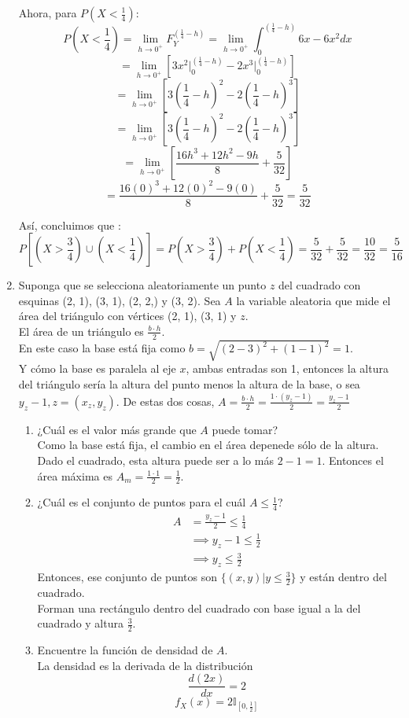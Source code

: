 \documentclass[12pt,a4paper]{report}
\begin{document}
\begin{enumerate}
{			Ahora, para $P(X < \frac{1}{4})$:
				$$ P(X < \frac{1}{4}) = \lim_{h\to 0^+} F_Y^{(\frac{1}{4} - h)}
				   =  \lim_{h\to 0^+} \int_{0}^{(\frac{1}{4} - h)} 6x - 6x^2 dx $$
				$$ =  \lim_{h\to 0^+} [3 x^2 \Big|_0^{(\frac{1}{4} - h)} - 2 x^3 \Big|_0^{(\frac{1}{4} - h)}] $$
				$$ =  \lim_{h\to 0^+} [3 (\frac{1}{4} - h)^2 - 2(\frac{1}{4} - h)^3]$$
				$$ =  \lim_{h\to 0^+} [3 (\frac{1}{4} - h)^2 - 2(\frac{1}{4} - h)^3]$$
				$$ =  \lim_{h\to 0^+} [\frac{16h^3+12h^2-9h}{8} + \frac{5}{32}]$$
				$$ =  \frac{16(0)^3+12(0)^2-9(0)}{8} + \frac{5}{32} = \frac{5}{32}$$

			Así, concluimos que :
				$$ P[(X > \frac{3}{4}) \cup (X < \frac{1}{4})]
				 = P(X > \frac{3}{4}) + P(X < \frac{1}{4})
				 = \frac{5}{32} + \frac{5}{32} = \frac{10}{32} = \frac{5}{16}$$
		}

		\item {
			Suponga que se selecciona aleatoriamente un punto $z$ del cuadrado con
			esquinas (2, 1), (3, 1), (2, 2,) y (3, 2). Sea $A$ la variable aleatoria
			que mide el área del triángulo con vértices (2, 1), (3, 1) y $z$.\\
			El área de un triángulo es $\frac{b\cdot h}{2}$. \\
			En este caso la base está fija como $b = \sqrt{(2-3)^2+(1-1)^2} = 1$.\\
			Y cómo la base es paralela al eje $x$, ambas entradas son 1,
			entonces la altura del triángulo sería la altura del punto menos la
			altura de la base, o sea $y_z-1, z = (x_z, y_z)$.
			De estas dos cosas, $A = \frac{b \cdot h}{2} = \frac{1 \cdot(y_z-1)}{2}
			= \frac{y_z-1}{2}$
			\begin{enumerate}
				\item {
					¿Cuál es el valor más grande que $A$ puede tomar?\\
					Como la base está fija, el cambio en el área depenede sólo
					de la altura.\\
					Dado el cuadrado, esta altura puede ser a lo más $2-1 = 1$.
					Entonces el área máxima es $A_m = \frac{1\cdot 1}{2} = \frac{1}{2}$.
				}
				\item {
					¿Cuál es el conjunto de puntos para el cuál $A \leq \frac{1}{4}$?
					\begin{align*}
						A &= \frac{y_z-1}{2} \leq \frac{1}{4}\\
						  &\implies y_z-1 \leq \frac{1}{2}\\
						  &\implies y_z \leq \frac{3}{2}
					\end{align*}
					Entonces, ese conjunto de puntos son $\{(x, y) | y \leq \frac{3}{2}\}$
					y están dentro del cuadrado.\\
					Forman una rectángulo dentro del cuadrado con base igual a
					la del cuadrado y altura $\frac{3}{2}$.
				}
				\item {
					Encuentre la función de densidad de $A$.\\
					La densidad es la derivada de la distribución
					\[\frac{d(2x)}{dx} = 2\]
					\[f_X(x) = 2 \mathbb{I}_{[0, \frac{1}{2}]}\]

}
\end{enumerate}}
\end{enumerate}
\end{document}
